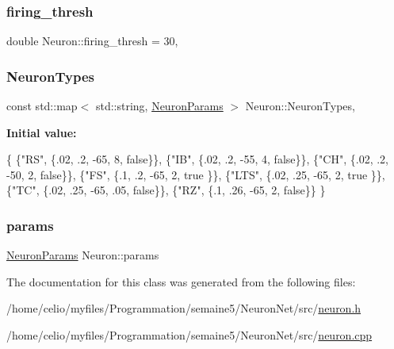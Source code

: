 \mbox{\label{classNeuron_a9173cec15070307b635e58f976113ad7}} 
\subsubsection{\texorpdfstring{firing\+\_\+thresh}{firing\_thresh}}
{\footnotesize\ttfamily double Neuron\+::firing\+\_\+thresh = 30\hspace{0.3cm}{\ttfamily [static]}, {\ttfamily [private]}}

\mbox{\label{classNeuron_ab4b47274e756b72923d2f8a9a5037d23}} 
\subsubsection{\texorpdfstring{Neuron\+Types}{NeuronTypes}}
{\footnotesize\ttfamily const std\+::map$<$ std\+::string, \hyperlink{structNeuronParams}{Neuron\+Params} $>$ Neuron\+::\+Neuron\+Types\hspace{0.3cm}{\ttfamily [static]}, {\ttfamily [private]}}

{\bfseries Initial value\+:}
\begin{DoxyCode}
\{
    \{\textcolor{stringliteral}{"RS"},  \{.02, .2,  -65, 8,   \textcolor{keyword}{false}\}\},
    \{\textcolor{stringliteral}{"IB"},  \{.02, .2,  -55, 4,   \textcolor{keyword}{false}\}\},
    \{\textcolor{stringliteral}{"CH"},  \{.02, .2,  -50, 2,   \textcolor{keyword}{false}\}\},
    \{\textcolor{stringliteral}{"FS"},  \{.1,  .2,  -65, 2,   \textcolor{keyword}{true} \}\},
    \{\textcolor{stringliteral}{"LTS"}, \{.02, .25, -65, 2,   \textcolor{keyword}{true} \}\},
    \{\textcolor{stringliteral}{"TC"},  \{.02, .25, -65, .05, \textcolor{keyword}{false}\}\},
    \{\textcolor{stringliteral}{"RZ"},  \{.1,  .26, -65, 2,   \textcolor{keyword}{false}\}\}
\}
\end{DoxyCode}
\mbox{\label{classNeuron_a9427965b6669c7c35c327689de7a4d63}} 
\subsubsection{\texorpdfstring{params}{params}}
{\footnotesize\ttfamily \hyperlink{structNeuronParams}{Neuron\+Params} Neuron\+::params\hspace{0.3cm}{\ttfamily [private]}}



The documentation for this class was generated from the following files\+:\begin{DoxyCompactItemize}
\item 
/home/celio/myfiles/\+Programmation/semaine5/\+Neuron\+Net/src/\hyperlink{neuron_8h}{neuron.\+h}\item 
/home/celio/myfiles/\+Programmation/semaine5/\+Neuron\+Net/src/\hyperlink{neuron_8cpp}{neuron.\+cpp}\end{DoxyCompactItemize}
